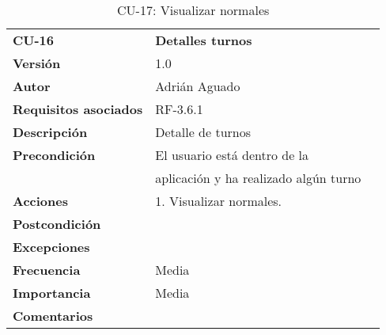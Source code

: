 \begin{table}
\begin{tabular}{llr}  
\toprule
\begin{minipage}[b]{0.24\columnwidth}\raggedright\strut
\textbf{CU-16}\strut
\end{minipage} & \begin{minipage}[b]{0.72\columnwidth}\raggedright\strut
\textbf{Detalles turnos}\strut
\end{minipage}\tabularnewline
\cmidrule(r){1-2}
\textbf{Versión}       & 1.0           \\
\textbf{Autor}       & Adrián  Aguado    \\
\textbf{Requisitos asociados}       & RF-3.6.1  \\
\textbf{Descripción} & Detalle de turnos \\
\textbf{Precondición}  & El usuario está dentro de la \\
& aplicación y ha realizado algún turno   \\
\textbf{Acciones} & 1. Visualizar normales. \\
\textbf{Postcondición} &  \\
\textbf{Excepciones} &     \\
\textbf{Frecuencia} & Media          \\
\textbf{Importancia} & Media           \\
\textbf{Comentarios } &   \\
\bottomrule
\end{tabular}
\caption{CU-17: Visualizar normales} 
\end{table}

